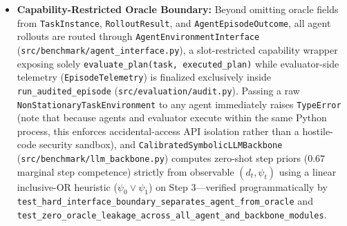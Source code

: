 \documentclass[10pt,letterpaper]{article}
\begin{document}
\begin{itemize}
  \item \textbf{Capability-Restricted Oracle Boundary:} Beyond omitting oracle fields from \texttt{Task\-Instance}, \texttt{Rollout\-Result}, and \texttt{Agent\-Episode\-Outcome}, all agent rollouts are routed through \texttt{Agent\-Environment\-Interface} (\texttt{src/\allowbreak benchmark/\allowbreak agent\_\allowbreak interface.py}), a slot-restricted capability wrapper exposing solely \texttt{evaluate\_\allowbreak plan(\allowbreak task,\allowbreak\ executed\_\allowbreak plan)} while evaluator-side telemetry (\texttt{Episode\-Telemetry}) is finalized exclusively inside \texttt{run\_\allowbreak audited\_\allowbreak episode} (\texttt{src/\allowbreak evaluation/\allowbreak audit.py}). Passing a raw \texttt{Non\-Stationary\-Task\-Environment} to any agent immediately raises \texttt{TypeError} (note that because agents and evaluator execute within the same Python process, this enforces accidental-access API isolation rather than a hostile-code security sandbox), and \texttt{Calibrated\-Symbolic\-LLM\-Backbone} (\texttt{src/\allowbreak benchmark/\allowbreak llm\_\allowbreak backbone.py}) computes zero-shot step priors ($0.67$ marginal step competence) strictly from observable $(d_t, \psi_t)$ using a linear inclusive-OR heuristic ($\psi_0 \lor \psi_1$) on Step 3—verified programmatically by \texttt{test\_hard\_\allowbreak interface\_\allowbreak boundary\_\allowbreak separates\_\allowbreak agent\_\allowbreak from\_\allowbreak oracle} and \texttt{test\_zero\_\allowbreak oracle\_\allowbreak leakage\_\allowbreak across\_\allowbreak all\_\allowbreak agent\_\allowbreak and\_\allowbreak backbone\_\allowbreak modules}.
\end{itemize}

\end{document}
